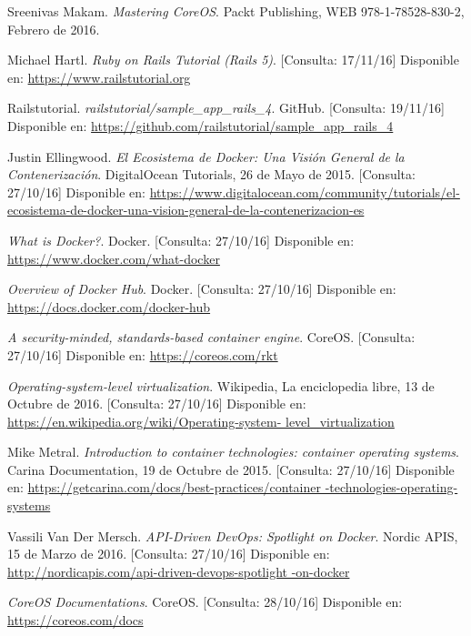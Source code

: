 \begin{thebibliography}{9}

Sreenivas Makam.
\textit{Mastering CoreOS}. 
Packt Publishing, WEB 978-1-78528-830-2, Febrero de 2016.

Michael Hartl.
\textit{Ruby on Rails Tutorial (Rails 5)}. [Consulta: 17/11/16]
Disponible en: \url{https://www.railstutorial.org}

Railstutorial.
\textit{railstutorial/sample\_app\_rails\_4}. GitHub. [Consulta: 19/11/16]
Disponible en: \url{https://github.com/railstutorial/sample\_app\_rails\_4}

Justin Ellingwood.
\textit{El Ecosistema de Docker: Una Visión General de la Contenerización}. 
DigitalOcean Tutorials, 26 de Mayo de 2015. [Consulta: 27/10/16]
Disponible en: \url{https://www.digitalocean.com/community/tutorials/el-ecosistema-de-docker-una-vision-general-de-la-contenerizacion-es}

\textit{What is Docker?}. Docker. [Consulta: 27/10/16]
Disponible en: \url{https://www.docker.com/what-docker}

\textit{Overview of Docker Hub}. Docker. [Consulta: 27/10/16]
Disponible en: \url{https://docs.docker.com/docker-hub}

\textit{A security-minded, standards-based container engine}. CoreOS. [Consulta: 27/10/16]
Disponible en: \url{https://coreos.com/rkt}

\textit{Operating-system-level virtualization}. 
Wikipedia, La enciclopedia libre, 13 de Octubre de 2016. [Consulta: 27/10/16]
Disponible en: \url{https://en.wikipedia.org/wiki/Operating-system-
level\_virtualization}

Mike Metral.
\textit{Introduction to container technologies: container operating systems}. 
Carina Documentation, 19 de Octubre de 2015. [Consulta: 27/10/16]
Disponible en: \url{https://getcarina.com/docs/best-practices/container
-technologies-operating-systems}

Vassili Van Der Mersch.
\textit{API-Driven DevOps: Spotlight on Docker}. 
Nordic APIS, 15 de Marzo de 2016. [Consulta: 27/10/16]
Disponible en: \url{http://nordicapis.com/api-driven-devops-spotlight
-on-docker}

\textit{CoreOS Documentations}. CoreOS. [Consulta: 28/10/16]
Disponible en: \url{https://coreos.com/docs}


\end{thebibliography}
